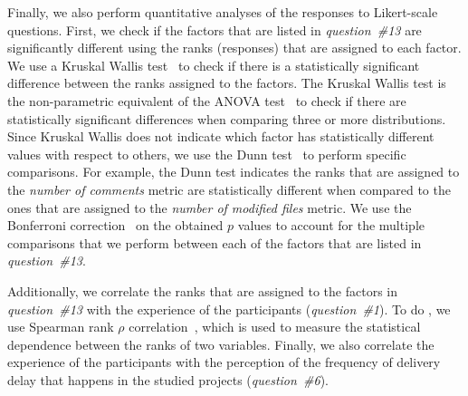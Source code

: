 Finally, we also perform quantitative analyses of the responses to Likert-scale
questions. First, we check if the factors that are listed in {\em question~\#13}
are significantly different using the ranks (responses) that are assigned to
each factor. We use a Kruskal Wallis test~\cite{kruskal1952use} to check if
there is a statistically significant difference between the ranks assigned to
the factors. The Kruskal Wallis test is the non-parametric equivalent of the
ANOVA test~\cite{fisher1925statistical} to check if there are statistically
significant differences when comparing three or more distributions. Since
Kruskal Wallis does not indicate which factor has statistically different values
with respect to others, we use the Dunn test~\cite{dunn1964multiple} to perform
specific comparisons. For example, the Dunn test indicates \DIFdelbegin {}\DIFdelend \DIFaddbegin {}\DIFaddend the ranks
that are assigned to the {\em number of comments} metric are statistically
different when compared to the ones that are assigned to the {\em number of
modified files} metric. We use the Bonferroni correction~\cite{dunn1961multiple}
on the obtained $p$ values to account for the multiple comparisons that we
perform between each of the factors that are listed in {\em question~\#13}. 

Additionally, we correlate the ranks that are assigned to the factors in {\em
question~\#13} with the experience of the participants ({\em question~\#1}). To
do \DIFdelbegin {}\DIFdelend \DIFaddbegin {}\DIFaddend , we use Spearman rank {$\rho$} correlation~\cite{spearman1904proof}, which
is used to measure the statistical dependence between the ranks of two
variables. Finally, we also correlate the experience of the participants with
the perception of the frequency of delivery delay that happens in the studied
projects ({\em question~\#6}).

\subsection{\DIFdelbegin {}\DIFdelend \DIFaddbegin {}\DIFaddend }\label{subsubsec:exploratory}

